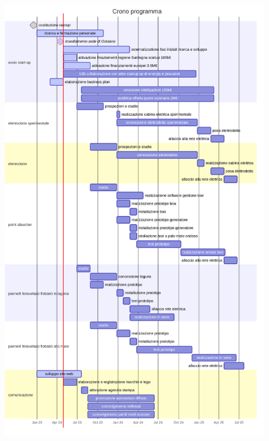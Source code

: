 \documentclass[
  onecolumn]{report}
\begin{document}
\begin{figure}[H]

{\centering \includegraphics[width=8.17in,height=13.29in]{lettera_files/figure-latex/mermaid-figure-2.png}

}

\end{figure}
\end{document}
